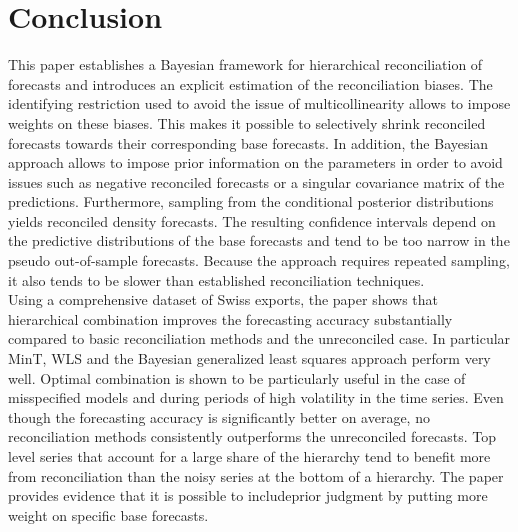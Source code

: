 \documentclass[a4paper,fleqn,11pt]{article}
\begin{document}
\section{Conclusion}\label{sec:conc}
This paper establishes a Bayesian framework for hierarchical reconciliation of forecasts and introduces an explicit estimation of the reconciliation biases. The identifying restriction used to avoid the issue of multicollinearity allows to impose weights on these biases. This makes it possible to selectively shrink reconciled forecasts towards their corresponding base forecasts. In addition, the Bayesian approach allows to impose prior information on the parameters in order to avoid issues such as negative reconciled forecasts or a singular covariance matrix of the predictions. Furthermore, sampling from the conditional posterior distributions yields reconciled density forecasts. The resulting confidence intervals depend on the predictive distributions of the base forecasts and tend to be too narrow in the pseudo out-of-sample forecasts. Because the approach requires repeated sampling, it also tends to be slower than established reconciliation techniques. \\

Using a comprehensive dataset of Swiss exports, the paper shows that hierarchical combination improves the forecasting accuracy substantially compared to basic reconciliation methods and the unreconciled case. In particular MinT, WLS and the Bayesian generalized least squares approach perform very well. Optimal combination is shown to be particularly useful in the case of misspecified models and during periods of high volatility in the time series. Even though the forecasting accuracy is significantly better on average, no reconciliation methods consistently outperforms the unreconciled forecasts. Top level series that account for a large share of the hierarchy tend to benefit more from reconciliation than the noisy series at the bottom of a hierarchy. The paper provides evidence that it is possible to includeprior judgment by putting more weight on specific base forecasts. 




\clearpage

\setcounter{page}{3}



\clearpage



\end{document}
